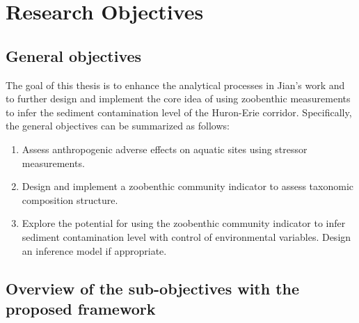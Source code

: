 \section{Research Objectives}

\subsection{General objectives}

The goal of this thesis is to enhance the analytical processes in Jian's work and 
to further design and implement the core idea of using zoobenthic measurements to 
infer the sediment contamination level of the Huron-Erie corridor.
Specifically, the general objectives can be summarized as follows:
\begin{enumerate}
    \item Assess anthropogenic adverse effects on aquatic sites using stressor measurements.
    \item Design and implement a zoobenthic community indicator to assess taxonomic composition structure.
    \item Explore the potential for using the zoobenthic community indicator 
    to infer sediment contamination level with control of environmental variables.
    Design an inference model if appropriate.
\end{enumerate}

\subsection{Overview of the sub-objectives with the proposed framework}

